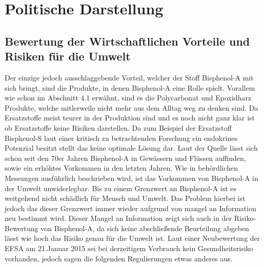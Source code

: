 \section{Politische Darstellung}
\subsection{Bewertung der Wirtschaftlichen Vorteile und Risiken für die Umwelt}
Der einzige jedoch ausschlaggebende Vorteil, welcher der Stoff Bisphenol-A mit sich bringt,
sind die Produkte, in denen Bisphenol-A eine Rolle spielt. Vorallem wie schon im
Abschnitt 4.1 erwähnt, sind es die Polycarbonat und Epoxidharz Produkte, welche
mitlerweile nicht mehr aus dem Alltag weg zu denken sind. Da Ersatzstoffe meist teurer
in der Produktion sind und es noch nicht ganz klar ist ob Ersatzstoffe
keine Risiken darstellen. Da zum Beispiel der Ersatzstoff Bisphenol-S laut einer
kritisch zu betrachtenden Forschung ein endokrines Potenzial besitzt\cite{Ersatzstoffe}
stellt das keine optimale Lösung dar.
Laut der Quelle \cite{Umweltbundesamt2016} lässt sich schon seit den 70er Jahren Bisphenol-A
in Gewässern und Flüssen auffinden, sowie ein erhöhtes Vorkommen in den letzten Jahren.
Wie in behördlichen Messungen ausführlich beschrieben wird, ist das Vorkommen von
Bisphenol-A in der Umwelt unwiderlegbar. Bis zu einem Grenzwert an Bisphenol-A ist es
weitgehend nicht schädlich für Mensch und Umwelt. Das Problem hierbei ist jedoch
das dieser Grenzwert immer wieder aufgrund von mangel an Information neu bestimmt wird.
Dieser Mangel an Information zeigt sich auch in der Risiko-Bewertung von Bisphenol-A, da sich keine abschließende Beurteilung abgeben lässt wie hoch das Risiko genau für die Umwelt ist. Laut einer Neubewertung der EFSA am 21.Januar 2015 sei bei derzeitigem Verbrauch kein Gesundheitsrisiko vorhanden, jedoch sagen die folgenden Regulierungen etwas anderes aus.
